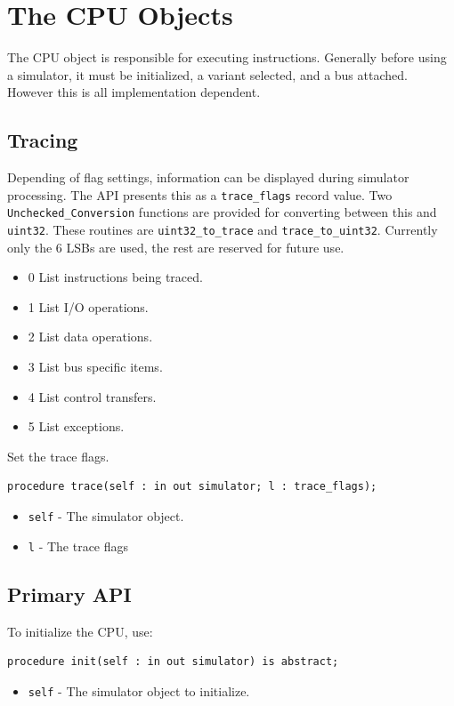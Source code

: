 \documentclass[10pt, openany]{book}
\newcommand{\package}[1]{\texttt{#1}}
\newcommand{\function}[1]{\texttt{#1}}
\newcommand{\keyword}[1]{\texttt{#1}}
\newcommand{\datatype}[1]{\texttt{#1}}
\begin{document}
\chapter{The CPU Objects}
\label{chap:CPU}
The CPU object is responsible for executing instructions.
Generally before using a simulator, it must be initialized, a variant selected, and a bus attached.
However this is all implementation dependent.

\section{Tracing}
Depending of flag settings, information can be displayed during simulator processing.
The API presents this as a \datatype{trace\_flags} record value.
Two \package{Unchecked\_Conversion} functions are provided for converting between this and \datatype{uint32}.
These routines are \function{uint32\_to\_trace} and \function{trace\_to\_uint32}.
Currently only the 6 LSBs are used, the rest are reserved for future use.
\begin{itemize}
  \item 0   List instructions being traced.
  \item 1   List I/O operations.
  \item 2   List data operations.
  \item 3   List bus specific items.
  \item 4   List control transfers.
  \item 5   List exceptions.
\end{itemize}

Set the trace flags.
\begin{lstlisting}
procedure trace(self : in out simulator; l : trace_flags);
\end{lstlisting}
\begin{itemize}
  \item \keyword{self} - The simulator object.
  \item \keyword{l} - The trace flags
\end{itemize}

\section{Primary API}
To initialize the CPU, use:
\begin{lstlisting}
procedure init(self : in out simulator) is abstract;
\end{lstlisting}
\begin{itemize}
  \item \keyword{self} - The simulator object to initialize.
\end{itemize}
\end{document}
